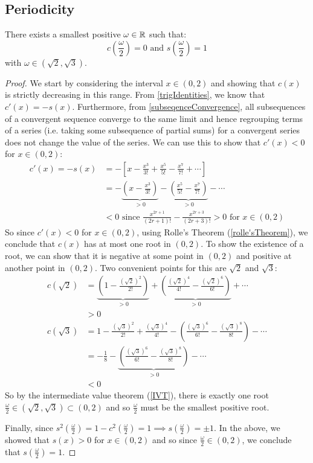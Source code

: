 \documentclass[../main.tex]{subfiles}
\begin{document}
\subsection{Periodicity}
\begin{proposition}
  There exists a smallest positive $\omega \in \mathbb{R}$ such that: \label{trigPeriodicity}
  \[
    c\left(\frac{\omega}{2}\right) = 0 \text{ and } s\left(\frac{\omega}{2}\right) = 1
  \]
  with $\omega \in (\sqrt{2}, \sqrt{3})$.
\end{proposition}
\begin{proof}
  We start by considering the interval $x \in (0, 2)$ and showing that $c(x)$ is strictly decreasing in this range.
  From \cref{trigIdentities}, we know that $c'(x) = -s(x)$.
  Furthermore, from \cref{subseqenceConvergence}, all subsequences of a convergent sequence converge to the same limit and hence regrouping terms of a series (i.e. taking some subsequence of partial sums) for a convergent series does not change the value of the series.
  We can use this to show that $c'(x) < 0$ for $x \in (0, 2)$:
  \begin{align*}
    c'(x) = -s(x) &= -\left[x - \frac{x^3}{3!} + \frac{x^5}{5!} - \frac{x^7}{7!} + \cdots\right] \\
                  &= -\underbrace{\left(x - \frac{x^3}{3!}\right)}_{>0} - \underbrace{\left(\frac{x^5}{5!} - \frac{x^7}{7!}\right)}_{>0} - \cdots  \\
                  &< 0 \text{ since $\frac{x^{2r + 1}}{(2r + 1)!} - \frac{x^{2r + 3}}{(2r + 3)!} > 0$ for $x \in (0, 2)$}
  \end{align*}
  So since $c'(x) < 0$ for $x \in (0, 2)$, using Rolle's Theorem (\cref{rolle'sTheorem}), we conclude that $c(x)$ has at most one root in $(0, 2)$.
  To show the existence of a root, we can show that it is negative at some point in $(0, 2)$ and positive at another point in $(0, 2)$.
  Two convenient points for this are $\sqrt{2}$ and $\sqrt{3}$:
  \begin{align*}
    c(\sqrt{2}) &= \underbrace{\left(1 - \frac{(\sqrt{2})^2}{2!}\right)}_{>0} + \underbrace{\left(\frac{(\sqrt{2})^{4}}{4!} - \frac{(\sqrt{2})^{6}}{6!}\right)}_{>0} + \cdots \\
                &> 0 \\
    c(\sqrt{3}) &= 1 - \frac{(\sqrt{3})^2}{2!} + \frac{(\sqrt{3})^{4}}{4!} - \left(\frac{(\sqrt{3})^{6}}{6!} - \frac{(\sqrt{3})^{8}}{8!}\right) - \cdots \\
                &= -\frac{1}{8} - \underbrace{\left(\frac{(\sqrt{3})^{6}}{6!} - \frac{(\sqrt{3})^{8}}{8!}\right)}_{>0} - \cdots \\
                &<0
  \end{align*}
  So by the intermediate value theorem (\cref{IVT}), there is exactly one root $\frac{\omega}{2} \in (\sqrt{2}, \sqrt{3}) \subset (0, 2)$ and so $\frac{\omega}{2}$ must be the smallest positive root.

  Finally, since $s^2\left(\frac{\omega}{2}\right) = 1 - c^2(\frac{\omega}{2}) = 1 \implies s(\frac{\omega}{2}) = \pm 1$.
  In the above, we showed that $s(x) > 0$ for $x \in (0, 2)$ and so since $\frac{\omega}{2} \in (0, 2)$, we conclude that $s(\frac{\omega}{2}) = 1$.
\end{proof}
\end{document}
